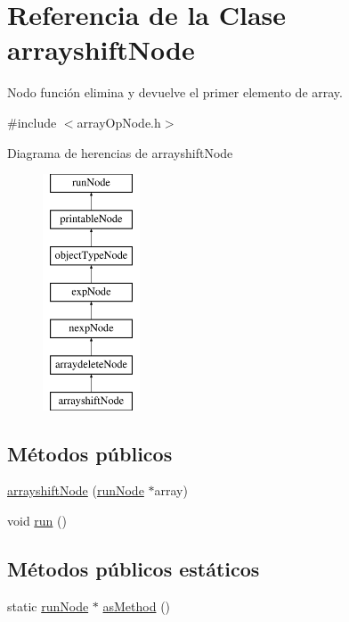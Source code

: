 \hypertarget{classarrayshiftNode}{\section{Referencia de la Clase arrayshift\-Node}
\label{classarrayshiftNode}
}


Nodo función elimina y devuelve el primer elemento de array.  




{\ttfamily \#include $<$array\-Op\-Node.\-h$>$}

Diagrama de herencias de arrayshift\-Node\begin{figure}[H]
\begin{center}
\leavevmode
\includegraphics[height=7.000000cm]{classarrayshiftNode}
\end{center}
\end{figure}
\subsection*{Métodos públicos}
\begin{DoxyCompactItemize}
\item 
\hyperlink{classarrayshiftNode_accfc038b2d871cbc2b5cb22c70442e0d}{arrayshift\-Node} (\hyperlink{classrunNode}{run\-Node} $\ast$array)
\item 
void \hyperlink{classarrayshiftNode_a2a34028d6f0763c7df0220ef2c624580}{run} ()
\end{DoxyCompactItemize}
\subsection*{Métodos públicos estáticos}
\begin{DoxyCompactItemize}
\item 
static \hyperlink{classrunNode}{run\-Node} $\ast$ \hyperlink{classarrayshiftNode_a83eac7bc2860d5b1bc4969ff00a85e77}{as\-Method} ()
\end{DoxyCompactItemize}


